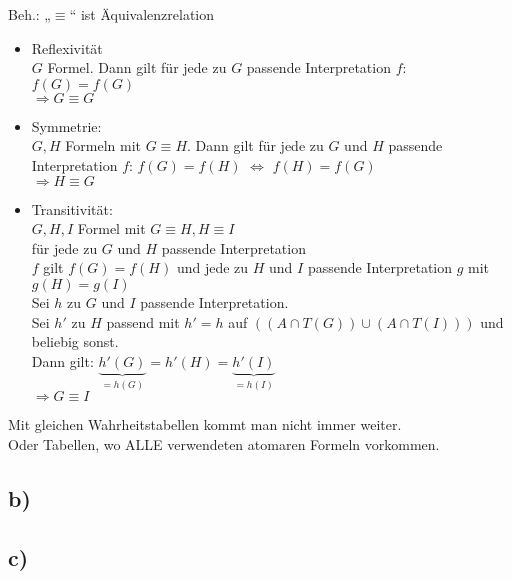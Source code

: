 \documentclass[a4paper]{scrartcl}
\begin{document}
Beh.: „$\equiv$“ ist Äquivalenzrelation
\begin{itemize}
\item Reflexivität\\
$G$ Formel. Dann gilt für jede zu $G$ passende Interpretation $f$: $f(G) = f(G)$\\
$\Rightarrow G \equiv G$

\item Symmetrie:\\
$G, H$ Formeln mit $G \equiv H$. Dann gilt für jede zu $G$ und $H$ passende Interpretation $f$: $f(G) = f(H)$ $\Leftrightarrow$ $f(H) = f(G)$\\
$\Rightarrow H \equiv G$

\item Transitivität:\\
$G, H, I$ Formel mit $G \equiv H, H \equiv I$\\
für jede zu $G$ und $H$ passende Interpretation\\
$f$ gilt $f(G) = f(H)$ und jede zu $H$ und $I$ passende Interpretation $g$ mit $g(H) = g(I)$\\
Sei $h$ zu $G$ und $I$ passende Interpretation.\\
Sei $h'$ zu $H$ passend mit $h' = h$ auf $((A \cap T(G)) \cup (A \cap T(I)))$ und beliebig sonst.\\
Dann gilt: $\underbrace{ h' (G) }_{=h(G)} = h' ( H) = \underbrace{ h'(I) }_{= h(I)}$\\
$\Rightarrow G \equiv I$
\end{itemize}

Mit gleichen Wahrheitstabellen kommt man nicht immer weiter.\\
Oder Tabellen, wo ALLE verwendeten atomaren Formeln vorkommen.


\subsection*{b)}



\subsection*{c)}
\end{document}
